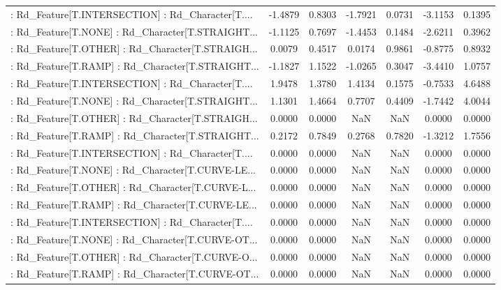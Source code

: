 \begin{longtable}{p{4cm}cccccc}
 : Rd\_Feature[T.INTERSECTION] : Rd\_Character[T.... & -1.4879 &    0.8303 & -1.7921 &       0.0731 & -3.1153 &  0.1395 \\
 : Rd\_Feature[T.NONE] : Rd\_Character[T.STRAIGHT... & -1.1125 &    0.7697 & -1.4453 &       0.1484 & -2.6211 &  0.3962 \\
 : Rd\_Feature[T.OTHER] : Rd\_Character[T.STRAIGH... &  0.0079 &    0.4517 &  0.0174 &       0.9861 & -0.8775 &  0.8932 \\
 : Rd\_Feature[T.RAMP] : Rd\_Character[T.STRAIGHT... & -1.1827 &    1.1522 & -1.0265 &       0.3047 & -3.4410 &  1.0757 \\
 : Rd\_Feature[T.INTERSECTION] : Rd\_Character[T.... &  1.9478 &    1.3780 &  1.4134 &       0.1575 & -0.7533 &  4.6488 \\
 : Rd\_Feature[T.NONE] : Rd\_Character[T.STRAIGHT... &  1.1301 &    1.4664 &  0.7707 &       0.4409 & -1.7442 &  4.0044 \\
 : Rd\_Feature[T.OTHER] : Rd\_Character[T.STRAIGH... &  0.0000 &    0.0000 &     NaN &          NaN &  0.0000 &  0.0000 \\
 : Rd\_Feature[T.RAMP] : Rd\_Character[T.STRAIGHT... &  0.2172 &    0.7849 &  0.2768 &       0.7820 & -1.3212 &  1.7556 \\
 : Rd\_Feature[T.INTERSECTION] : Rd\_Character[T.... &  0.0000 &    0.0000 &     NaN &          NaN &  0.0000 &  0.0000 \\
 : Rd\_Feature[T.NONE] : Rd\_Character[T.CURVE-LE... &  0.0000 &    0.0000 &     NaN &          NaN &  0.0000 &  0.0000 \\
 : Rd\_Feature[T.OTHER] : Rd\_Character[T.CURVE-L... &  0.0000 &    0.0000 &     NaN &          NaN &  0.0000 &  0.0000 \\
 : Rd\_Feature[T.RAMP] : Rd\_Character[T.CURVE-LE... &  0.0000 &    0.0000 &     NaN &          NaN &  0.0000 &  0.0000 \\
 : Rd\_Feature[T.INTERSECTION] : Rd\_Character[T.... &  0.0000 &    0.0000 &     NaN &          NaN &  0.0000 &  0.0000 \\
 : Rd\_Feature[T.NONE] : Rd\_Character[T.CURVE-OT... &  0.0000 &    0.0000 &     NaN &          NaN &  0.0000 &  0.0000 \\
 : Rd\_Feature[T.OTHER] : Rd\_Character[T.CURVE-O... &  0.0000 &    0.0000 &     NaN &          NaN &  0.0000 &  0.0000 \\
 : Rd\_Feature[T.RAMP] : Rd\_Character[T.CURVE-OT... &  0.0000 &    0.0000 &     NaN &          NaN &  0.0000 &  0.0000 \\

\end{longtable}
